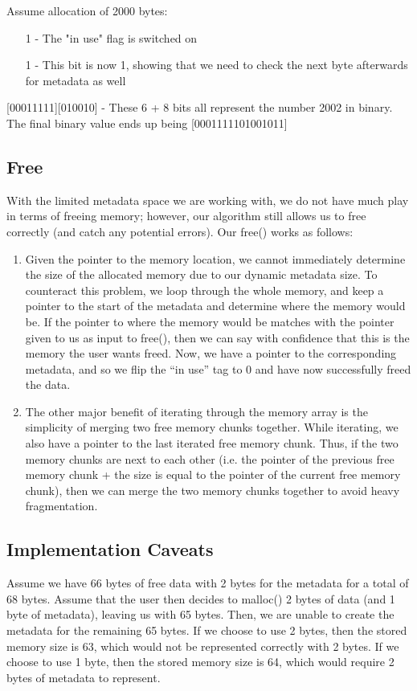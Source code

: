 \documentclass{article}
\begin{document}
    \vspace{.5cm}
    \noindent Assume allocation of 2000 bytes:
    \begin{enumerate}
        \item[1 - ] The "in use" flag is switched on
        \item[1 - ] This bit is now 1, showing that we need to check the next byte afterwards for metadata as well
    \end{enumerate}
    [00011111][010010] - These 6 + 8 bits all represent the number 2002 in binary. The final binary value ends up being [0001111101001011]

    \subsection*{Free}
    With the limited metadata space we are working with, we do not have much play in terms of freeing memory; however, our algorithm still allows us to free correctly (and catch any potential errors). Our free() works as follows:
    \begin{enumerate}
        \item
            Given the pointer to the memory location, we cannot immediately determine the size of the allocated memory due to our dynamic metadata size. To counteract this problem, we loop through the whole memory, and keep a pointer to the start of the metadata and determine where the memory would be. If the pointer to where the memory would be matches with the pointer given to us as input to free(), then we can say with confidence that this is the memory the user wants freed. Now, we have a pointer to the corresponding metadata, and so we flip the “in use” tag to 0 and have now successfully freed the data.
        \item
            The other major benefit of iterating through the memory array is the simplicity of merging two free memory chunks together. While iterating, we also have a pointer to the last iterated free memory chunk. Thus, if the two memory chunks are next to each other (i.e. the pointer of the previous free memory chunk + the size is equal to the pointer of the current free memory chunk), then we can merge the two memory chunks together to avoid heavy fragmentation.
    \end{enumerate}

    \subsection*{Implementation Caveats}
    Assume we have 66 bytes of free data with 2 bytes for the metadata for a total of 68 bytes. Assume that the user then decides to malloc() 2 bytes of data (and 1 byte of metadata), leaving us with 65 bytes. Then, we are unable to create the metadata for the remaining 65 bytes. If we choose to use 2 bytes, then the stored memory size is 63, which would not be represented correctly with 2 bytes. If we choose to use 1 byte, then the stored memory size is 64, which would require 2 bytes of metadata to represent.
    
\end{document}
